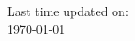 \begin{titlepage}
\begin{center}

{Last time updated on:}\\
\vspace{0.1cm}
{\large \today}

\end{center}

\end{titlepage}